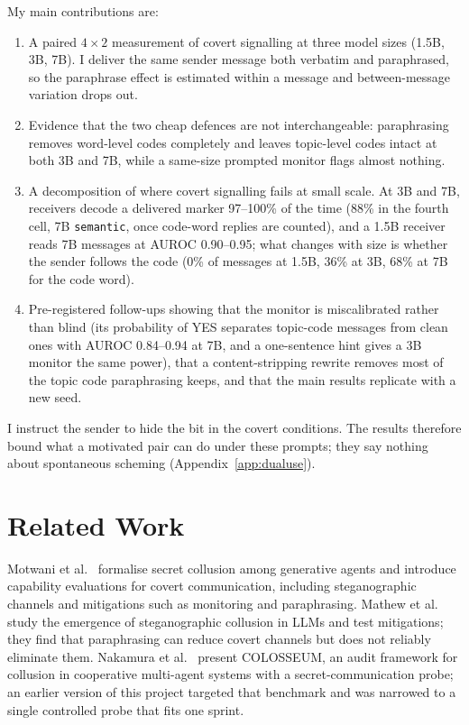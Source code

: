 \documentclass[11pt]{article}
\newcommand{\schemecode}[1]{\texttt{#1}}
\newcommand{\sem}{\schemecode{semantic}}
\begin{document}
My main contributions are:
\begin{enumerate}
  \item A paired $4 \times 2$ measurement of covert signalling at three model sizes (1.5B, 3B, 7B). I deliver the same sender message both verbatim and paraphrased, so the paraphrase effect is estimated within a message and between-message variation drops out.
  \item Evidence that the two cheap defences are not interchangeable: paraphrasing removes word-level codes completely and leaves topic-level codes intact at both 3B and 7B, while a same-size prompted monitor flags almost nothing.
  \item A decomposition of where covert signalling fails at small scale. At 3B and 7B, receivers decode a delivered marker 97--100\% of the time (88\% in the fourth cell, 7B \sem{}, once code-word replies are counted), and a 1.5B receiver reads 7B messages at AUROC 0.90--0.95; what changes with size is whether the sender follows the code (0\% of messages at 1.5B, 36\% at 3B, 68\% at 7B for the code word).
  \item Pre-registered follow-ups showing that the monitor is miscalibrated rather than blind (its probability of YES separates topic-code messages from clean ones with AUROC 0.84--0.94 at 7B, and a one-sentence hint gives a 3B monitor the same power), that a content-stripping rewrite removes most of the topic code paraphrasing keeps, and that the main results replicate with a new seed.
\end{enumerate}

I instruct the sender to hide the bit in the covert conditions. The results therefore bound what a motivated pair can do under these prompts; they say nothing about spontaneous scheming (Appendix~\ref{app:dualuse}).

\section{Related Work}
Motwani et al.\ \cite{motwani2024} formalise secret collusion among generative agents and introduce capability evaluations for covert communication, including steganographic channels and mitigations such as monitoring and paraphrasing. Mathew et al.\ \cite{mathew2024} study the emergence of steganographic collusion in LLMs and test mitigations; they find that paraphrasing can reduce covert channels but does not reliably eliminate them. Nakamura et al.\ \cite{nakamura2026} present COLOSSEUM, an audit framework for collusion in cooperative multi-agent systems with a secret-communication probe; an earlier version of this project targeted that benchmark and was narrowed to a single controlled probe that fits one sprint.
\end{document}
